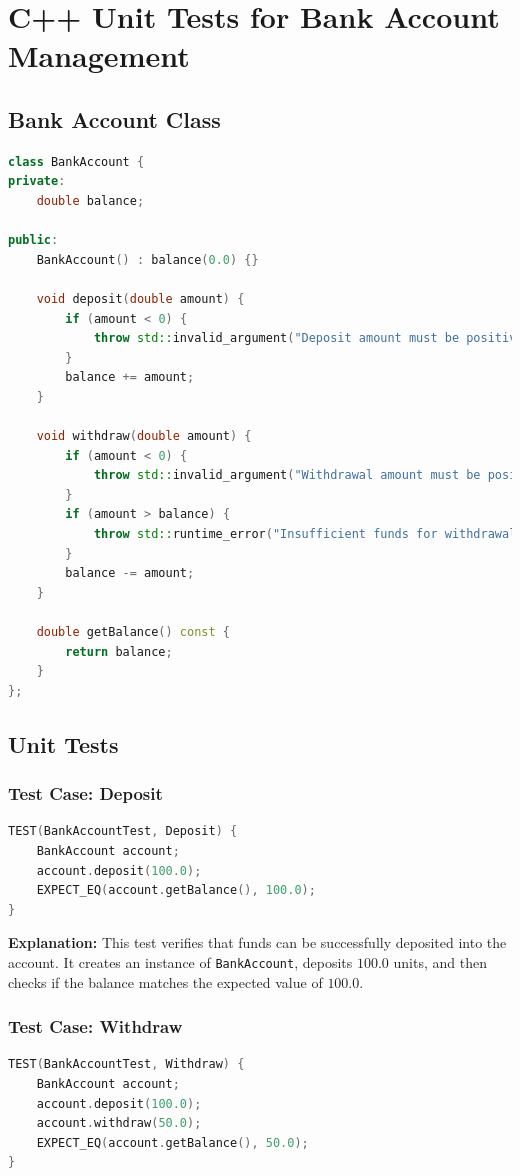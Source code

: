\section{C++ Unit Tests for Bank Account Management}
\label{appendix:unit-tests}

\subsection*{Bank Account Class}

\begin{lstlisting}[language=C++]
class BankAccount {
private:
    double balance;

public:
    BankAccount() : balance(0.0) {}

    void deposit(double amount) {
        if (amount < 0) {
            throw std::invalid_argument("Deposit amount must be positive");
        }
        balance += amount;
    }

    void withdraw(double amount) {
        if (amount < 0) {
            throw std::invalid_argument("Withdrawal amount must be positive");
        }
        if (amount > balance) {
            throw std::runtime_error("Insufficient funds for withdrawal");
        }
        balance -= amount;
    }

    double getBalance() const {
        return balance;
    }
};
\end{lstlisting}

\subsection*{Unit Tests}

\subsubsection*{Test Case: Deposit}
\begin{lstlisting}[language=C++]
TEST(BankAccountTest, Deposit) {
    BankAccount account;
    account.deposit(100.0);
    EXPECT_EQ(account.getBalance(), 100.0);
}
\end{lstlisting}

\textbf{Explanation:} This test verifies that funds can be successfully deposited into the account. It creates an instance of \texttt{BankAccount}, deposits $100.0$ units, and then checks if the balance matches the expected value of $100.0$.

\subsubsection*{Test Case: Withdraw}
\begin{lstlisting}[language=C++]
TEST(BankAccountTest, Withdraw) {
    BankAccount account;
    account.deposit(100.0);
    account.withdraw(50.0);
    EXPECT_EQ(account.getBalance(), 50.0);
}
\end{lstlisting}

